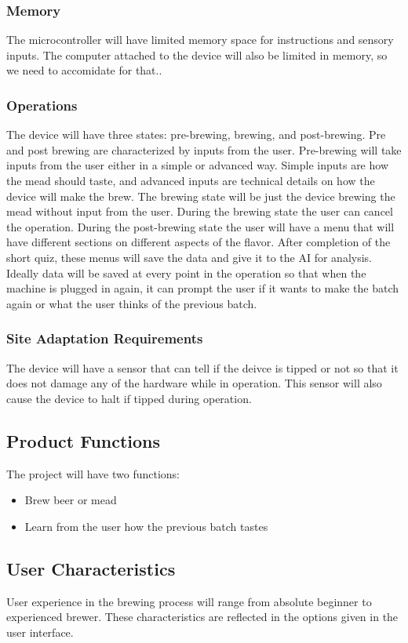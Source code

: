 \documentclass[draftclsnofoot,onecolumn,letterpaper,10pt]{IEEEtran}
\begin{document}
\subsubsection{Memory}
The microcontroller will have limited memory space for instructions and sensory inputs.
The computer attached to the device will also be limited in memory, so we need to accomidate for that..

\subsubsection{Operations}
The device will have three states: pre-brewing, brewing, and post-brewing.
Pre and post brewing are characterized by inputs from the user.
Pre-brewing will take inputs from the user either in a simple or advanced way.
Simple inputs are how the mead should taste, and advanced inputs are technical details on how the device will make the brew.
The brewing state will be just the device brewing the mead without input from the user.
During the brewing state the user can cancel the operation.
During the post-brewing state the user will have a menu that will have different sections on different aspects of the flavor.
After completion of the short quiz, these menus will save the data and give it to the AI for analysis.
Ideally data will be saved at every point in the operation so that when the machine is plugged in again, it can prompt the user if it wants to make the batch again or what the user thinks of the previous batch.

\subsubsection{Site Adaptation Requirements}
The device will have a sensor that can tell if the deivce is tipped or not so that it does not damage any of the hardware while in operation.
This sensor will also cause the device to halt if tipped during operation.

\subsection{Product Functions}
The project will have two functions:
\begin{itemize}
	\item Brew beer or mead
	\item Learn from the user how the previous batch tastes
\end{itemize}

\subsection{User Characteristics}
User experience in the brewing process will range from absolute beginner to experienced brewer.
These characteristics are reflected in the options given in the user interface.
\end{document}
